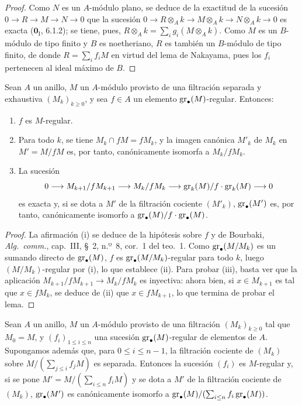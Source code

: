 \begin{proof}
Como $N$ es un $A$-módulo plano, se deduce de la exactitud de la sucesión
$0\to R\to M\to N\to0$ que la sucesión
$0\to R\otimes_A k\to M\otimes_A k\to N\otimes_A k\to0$
es exacta ($\mathbf{0}_{\mathrm I}$, 6.1.2); se tiene, pues,
$R\otimes_A k=\sum_i g_i(M\otimes_A k)$. Como $M$ es un $B$-módulo de tipo
finito y $B$ es noetheriano, $R$ es también un $B$-módulo de tipo finito, de
donde $R=\sum_i f_iM$ en virtud del lema de Nakayama, pues los $f_i$ pertenecen
al ideal máximo de $B$.
\end{proof}

\begin{lemma}[15.1.18]
\label{0.15.1.18-fr}
Sean $A$ un anillo, $M$ un $A$-módulo provisto de una filtración separada y
exhaustiva $(M_k)_{k\geq0}$, y sea $f\in A$ un elemento
$\operatorname{gr}_\bullet(M)$-regular. Entonces:
\begin{enumerate}
  \item[\textup{(i)}] $f$ es $M$-regular.
  \item[\textup{(ii)}] Para todo $k$, se tiene $M_k\cap fM=fM_k$, y la imagen canónica
  $M'_k$ de $M_k$ en $M'=M/fM$ es, por tanto, canónicamente isomorfa a
  $M_k/fM_k$.
  \item[\textup{(iii)}] La sucesión
  \[
    0\longrightarrow M_{k+1}/fM_{k+1}\longrightarrow M_k/fM_k
    \longrightarrow\operatorname{gr}_k(M)/f\cdot\operatorname{gr}_k(M)\longrightarrow0
  \]
  es exacta y, si se dota a $M'$ de la filtración cociente $(M'_k)$,
  $\operatorname{gr}_\bullet(M')$ es, por tanto, canónicamente isomorfo a
  $\operatorname{gr}_\bullet(M)/f\cdot\operatorname{gr}_\bullet(M)$.
\end{enumerate}
\end{lemma}

\begin{proof}
La afirmación (i) se deduce de la hipótesis sobre $f$ y de Bourbaki,
\emph{Alg.~comm.}, cap.~III, \S~2, n.º~8, cor.~1 del teo.~1. Como
$\operatorname{gr}_\bullet(M/M_k)$ es un sumando directo de $\operatorname{gr}_\bullet(M)$, $f$ es
$\operatorname{gr}_\bullet(M/M_k)$-regular para todo $k$, luego $(M/M_k)$-regular por (i),
lo que establece (ii). Para probar (iii), basta ver que la aplicación
$M_{k+1}/fM_{k+1}\to M_k/fM_k$ es inyectiva: ahora bien, si
$x\in M_{k+1}$ es tal que $x\in fM_k$, se deduce de (ii) que
$x\in fM_{k+1}$, lo que termina de probar el lema.
\end{proof}

\begin{proposition}[15.1.19]
\label{0.15.1.19-fr}
Sean $A$ un anillo, $M$ un $A$-módulo provisto de una filtración
$(M_k)_{k\geq0}$ tal que $M_0=M$, y $(f_i)_{1\leq i\leq n}$ una sucesión
$\operatorname{gr}_\bullet(M)$-regular de elementos de $A$. Supongamos además que, para
$0\leq i\leq n-1$, la filtración cociente de $(M_k)$ sobre
$M/(\sum_{j\leq i}f_jM)$
es separada. Entonces la sucesión $(f_i)$ es $M$-regular y, si se pone
$M'=M/(\sum_{i\leq n}f_iM)$
y se dota a $M'$ de la filtración cociente de $(M_k)$,
$\operatorname{gr}_\bullet(M')$ es canónicamente isomorfo a
$\operatorname{gr}_\bullet(M)/(\sum_{i\leq n}f_i\operatorname{gr}_\bullet(M))$.
\end{proposition}

